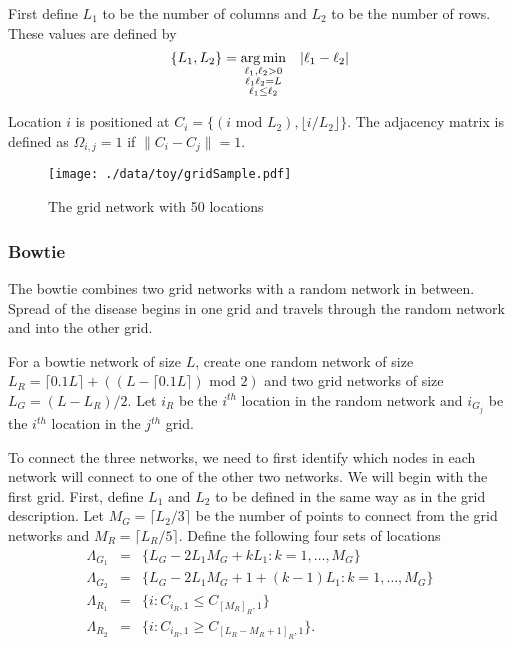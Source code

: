 \documentclass[11pt]{article}
\begin{document}
First define $L_1$ to be the number of columns and $L_2$ to be the
number of rows.  These values are defined by
\begin{equation*}
\lbrace L_1, L_2 \rbrace = \underset{
\begin{subarray}{c}
\ell_1,\ell_2 > 0\\
\ell_1\ell_2 = L\\
\ell_1 \le \ell_2
\end{subarray}
}{\arg\min} \quad |\ell_1 - \ell_2|
\end{equation*}

Location $i$ is positioned at $C_i = \lbrace (i \text{ mod } L_2), \lfloor
    i/L_2 \rfloor \rbrace$.  The adjacency matrix is defined as $\Omega_{i,j} =
    1$ if $\|C_i - C_j\| = 1$.

\begin{figure}[htb]
\centering
\texttt{[image: ./data/toy/gridSample.pdf]}
\caption{\label{fig:grid50}The grid network with 50 locations}
\end{figure}



\subsubsection{Bowtie}
\label{sec-3-1-5}

The bowtie combines two grid networks with a random network in
between.  Spread of the disease begins in one grid and travels through
the random network and into the other grid.

For a bowtie network of size $L$, create one random network of size
$L_R = \lceil 0.1 L \rceil + ((L - \lceil 0.1 L \rceil) \text{ mod }
    2)$ and two grid networks of size $L_G = (L - L_R)/2$.  Let $i_{R}$ be
the $i^{th}$ location in the random network and $i_{G_j}$ be the
$i^{th}$ location in the $j^{th}$ grid.

To connect the three networks, we need to first identify which nodes
in each network will connect to one of the other two networks.  We
will begin with the first grid.  First, define $L_1$ and $L_2$ to be
defined in the same way as in the grid description.  Let $M_{G} =
    \lceil L_2/3 \rceil$ be the number of points to connect from the grid
networks and $M_{R} = \lceil L_R/5 \rceil$.  Define the following four
sets of locations
\begin{equation*}
\begin{array}{rcl}
\Lambda_{G_1} & = & \lbrace L_G -
2L_1M_G + kL_1 : k = 1,\ldots,M_G\rbrace\\
\Lambda_{G_2} & = & \lbrace L_G -
2L_1M_G + 1 + (k-1)L_1 : k =
1,\ldots,M_G\rbrace\\
\Lambda_{R_1} & = & \lbrace i : C_{i_R,1} \le C_{[M_R]_{R},1} \rbrace\\
\Lambda_{R_2} & = & \lbrace i : C_{i_R,1} \ge C_{[L_R - M_R + 1]_{R},1} \rbrace.
\end{array}
\end{equation*}
\end{document}
